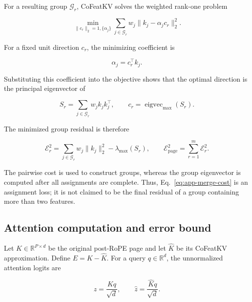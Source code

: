 \documentclass{article} %
\begin{document}
For a resulting group $\mathcal{G}_r$, CoFeatKV solves the weighted
rank-one problem

\begin{equation}
    \min_{\|c_r\|_2=1,\{\alpha_j\}}
    \sum_{j\in\mathcal{G}_r}w_j
    \|k_j-\alpha_jc_r\|_2^2.
    \label{eq:app-group-objective}
\end{equation}

For a fixed unit direction $c_r$, the minimizing coefficient is

\begin{equation}
    \alpha_j=c_r^{\top}k_j.
    \label{eq:app-coeff}
\end{equation}

Substituting this coefficient into the objective shows that the optimal
direction is the principal eigenvector of

\begin{equation}
    S_r=\sum_{j\in\mathcal{G}_r}w_jk_jk_j^{\top},
    \qquad
    c_r=\operatorname{eigvec}_{\max}(S_r).
    \label{eq:app-group-eigenvector}
\end{equation}

The minimized group residual is therefore

\begin{equation}
    \mathcal{E}_r^2
    =\sum_{j\in\mathcal{G}_r}w_j\|k_j\|_2^2
    -\lambda_{\max}(S_r),
    \qquad
    \mathcal{E}_{\mathrm{page}}^2=\sum_{r=1}^{m}\mathcal{E}_r^2.
    \label{eq:app-group-residual}
\end{equation}

The pairwise cost is used to construct groups, whereas the group eigenvector
is computed after all assignments are complete. Thus, Eq.~\eqref{eq:app-merge-cost}
is an assignment loss; it is not claimed to be the final residual of a group
containing more than two features.

\subsection{Attention computation and error bound}
\label{app:error-analysis}

Let $K\in\mathbb{R}^{P\times d}$ be the original post-RoPE page and let
$\widehat K$ be its CoFeatKV approximation. Define $E=K-\widehat K$. For a
query $q\in\mathbb{R}^{d}$, the unnormalized attention logits are

\begin{equation}
    z=\frac{Kq}{\sqrt d},
    \qquad
    \widehat z=\frac{\widehat Kq}{\sqrt d}.
\end{equation}
\end{document}
